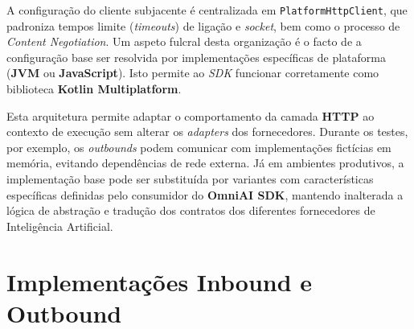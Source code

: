     A configuração do cliente subjacente é centralizada em \texttt{PlatformHttpClient}, que padroniza tempos limite (\textit{timeouts}) de ligação e \textit{socket}, bem como o processo de \textit{Content Negotiation}. Um aspeto fulcral desta organização é o facto de a configuração base ser resolvida por implementações específicas de plataforma (\textbf{JVM} ou \textbf{JavaScript}). Isto permite ao \textit{SDK} funcionar corretamente como biblioteca \textbf{Kotlin Multiplatform}.

Esta arquitetura permite adaptar o comportamento da camada \textbf{HTTP} ao contexto de execução sem alterar os \textit{adapters} dos fornecedores. Durante os testes, por exemplo, os \textit{outbounds} podem comunicar com implementações fictícias em memória, evitando dependências de rede externa. Já em ambientes produtivos, a implementação base pode ser substituída por variantes com características específicas definidas pelo consumidor do \textbf{OmniAI SDK}, mantendo inalterada a lógica de abstração e tradução dos contratos dos diferentes fornecedores de Inteligência Artificial.



    \section{Implementações Inbound e Outbound}
    \label{sec:inbounds-outbounds}
    
